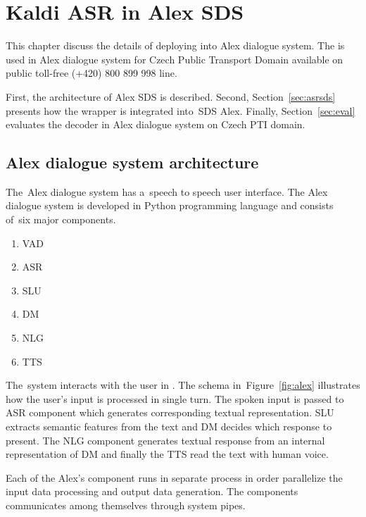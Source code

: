 \chapter{Kaldi \acs{ASR} in Alex \acs{SDS}}
\label{cha:integration}

This chapter discuss the details of deploying  into Alex dialogue system.
The  is used in Alex dialogue system for Czech Public Transport Domain available on public toll-free (+420) 800 899 998 line.

First, the architecture of Alex \acf{SDS} is described.
Second, Section~\ref{sec:asrsds} presents how the wrapper  is integrated into~\ac{SDS} Alex.
Finally, Section~\ref{sec:eval} evaluates the decoder in Alex dialogue system on Czech \ac{PTI} domain. 

\section{Alex dialogue system architecture} 
\label{sec:arch}

The~Alex dialogue system has a~speech to speech user interface. 
The Alex dialogue system is developed in Python programming language and consists of~six major components. 
\begin{enumerate}
    \item \acf{VAD} 
    \item \acf{ASR}
    \item \acf{SLU}
    \item \acf{DM}
    \item \acf{NLG}
    \item \acf{TTS}
\end{enumerate}
The~system interacts with the user in . 
The schema in~Figure~\ref{fig:alex} illustrates how the user's input is processed in single turn.
The spoken input is passed to \ac{ASR} component which generates corresponding textual representation.
\ac{SLU} extracts semantic features from the text and \ac{DM} decides which response to present.
The \ac{NLG} component generates textual response from an internal representation of \ac{DM} and finally the \ac{TTS} read the text with human voice.

Each of the Alex's component runs in separate process in order parallelize the input data processing and output data generation.
The components communicates among themselves through system pipes.


